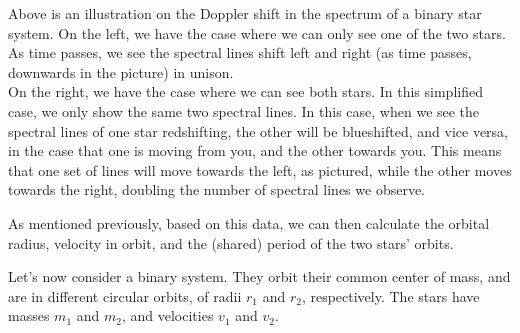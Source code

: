 %
%
%
%
%

Above is an illustration on the Doppler shift in the spectrum of a binary star system. On the left, we have the case where we can only see one of the two stars. As time passes, we see the spectral lines shift left and right (as time passes, downwards in the picture) in unison.\\
On the right, we have the case where we can see both stars. In this simplified case, we only show the same two spectral lines. In this case, when we see the spectral lines of one star redshifting, the other will be blueshifted, and vice versa, in the case that one is moving from you, and the other towards you. This means that one set of lines will move towards the left, as pictured, while the other moves towards the right, doubling the number of spectral lines we observe.

As mentioned previously, based on this data, we can then calculate the orbital radius, velocity in orbit, and the (shared) period of the two stars' orbits.

Let's now consider a binary system. They orbit their common center of mass, and are in different circular orbits, of radii $r_1$ and $r_2$, respectively. The stars have masses $m_1$ and $m_2$, and velocities $v_1$ and $v_2$.

